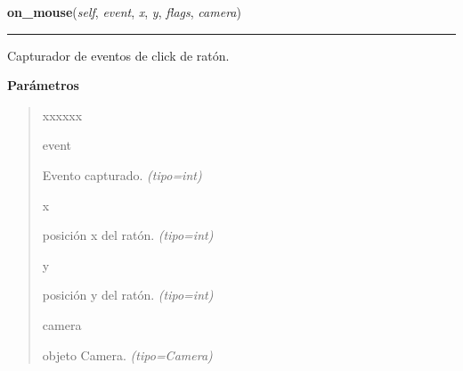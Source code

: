 \hspace{.8\funcindent}\begin{boxedminipage}{\funcwidth}

    \raggedright \textbf{on\_mouse}(\textit{self}, \textit{event}, \textit{x}, \textit{y}, \textit{flags}, \textit{camera})

    \vspace{-1.5ex}

    \rule{\textwidth}{0.5\fboxrule}
\setlength{\parskip}{2ex}
Capturador de eventos de click de ratón.

\setlength{\parskip}{1ex}
      \textbf{Parámetros}
      \vspace{-1ex}

      \begin{quote}
        \begin{Ventry}{xxxxxx}

          \item[event]


Evento capturado.
            {\it (tipo=int)}

          \item[x]


posición x del ratón.
            {\it (tipo=int)}

          \item[y]


posición y del ratón.
            {\it (tipo=int)}

          \item[camera]


objeto Camera.
            {\it (tipo=Camera)}

        \end{Ventry}

      \end{quote}

    \end{boxedminipage}

    \label{src:cameras:Cameras:check_cameras}

    \vspace{0.5ex}

